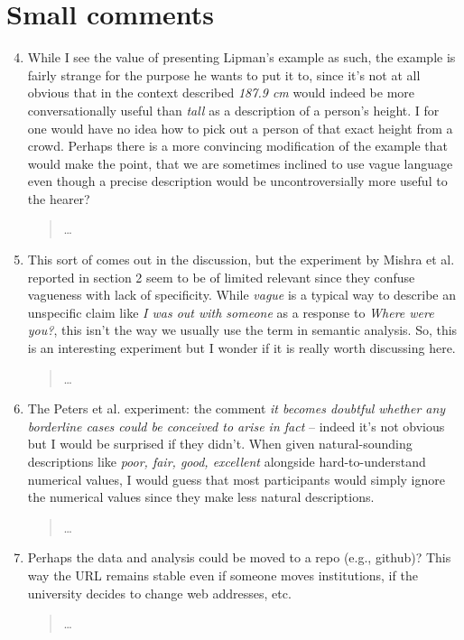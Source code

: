 \documentclass{tufte-handout}
\begin{document}
\section{Small comments}

\begin{enumerate}\setcounter{enumi}{3}

\item While I see the value of presenting Lipman's example as such, the example is fairly strange for the purpose he wants to put it to, since it's not at all obvious that in the context described \emph{187.9 cm} would indeed be more conversationally useful than \emph{tall} as a description of a person's height. I for one would have no idea how to pick out a person of that exact height from a crowd. Perhaps there is a more convincing modification of the example that would make the point, that we are sometimes inclined to use vague language even though a precise description would be uncontroversially more useful to the hearer?
\begin{quote}\ldots\end{quote}

\item This sort of comes out in the discussion, but the experiment by Mishra et al. reported in section 2 seem to be of limited relevant since they confuse vagueness with lack of specificity. While \emph{vague} is a typical way to describe an unspecific claim like \emph{I was out with someone} as a response to \emph{Where were you?}, this isn't the way we usually use the term in semantic analysis. So, this is an interesting experiment but I wonder if it is really worth discussing here.
\begin{quote}\ldots\end{quote}

\item The Peters et al. experiment: the comment \emph{it becomes doubtful whether any borderline cases could be conceived to arise in fact} -- indeed it's not obvious but I would be surprised if they didn't. When given natural-sounding descriptions like \emph{poor, fair, good, excellent} alongside hard-to-understand numerical values, I would guess that most participants would simply ignore the numerical values since they make less natural descriptions.
\begin{quote}\ldots\end{quote}

\item Perhaps the data and analysis could be moved to a repo (e.g., github)? This way the URL remains stable even if someone moves institutions, if the university decides to change web addresses, etc. 
\begin{quote}\ldots\end{quote}


\end{enumerate}
\end{document}
